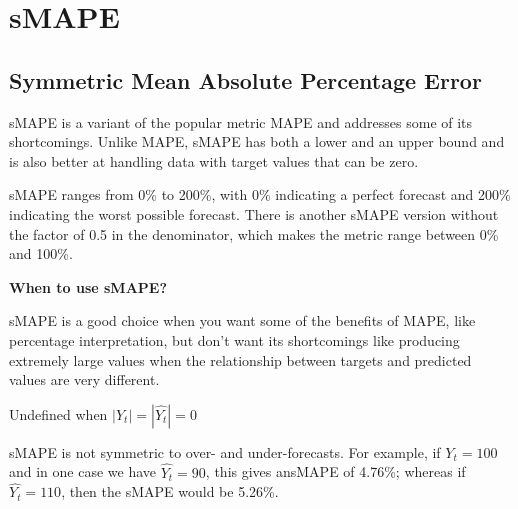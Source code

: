 \clearpage
\thispagestyle{regressionstyle}
\section{sMAPE}
\subsection{Symmetric Mean Absolute Percentage Error}

sMAPE is a variant of the popular metric MAPE and addresses some of its shortcomings. Unlike MAPE, sMAPE has both a lower and an upper bound and is also better
at handling data with target values that can be zero.

\begin{center}
\end{center}

sMAPE ranges from 0\% to 200\%, with 0\% indicating a perfect forecast and 200\% indicating the worst possible forecast. There is another sMAPE version without the factor of 0.5 in the denominator, which makes the metric range between 0\% and 100\%.

\textbf{When to use sMAPE?}

sMAPE is a good choice when you want some of the benefits of MAPE, like percentage interpretation, but don't want its shortcomings like producing extremely large values when the relationship between
targets and predicted values are very different.

{
    \item Undefined when $|Y_{t}| = |\hat{Y_{t}}| = 0$
    \item sMAPE is not symmetric to over- and under-forecasts. For example, if $Y_{t} = 100$ and in one case we have $\hat{Y_{t}} = 90$, this gives ansMAPE of 4.76\%; whereas if $\hat{Y_{t}} = 110$, then the sMAPE would be 5.26\%.
}


